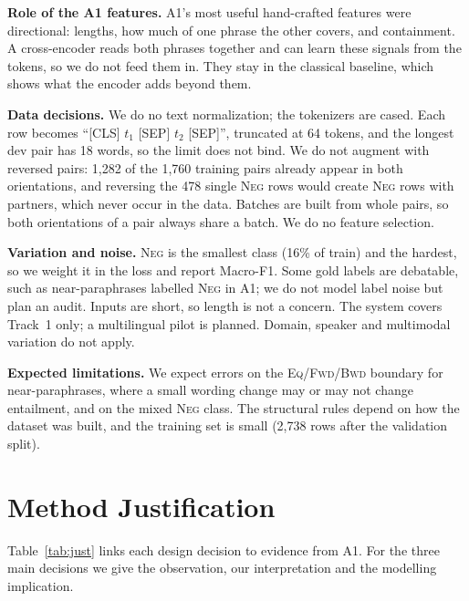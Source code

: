 \documentclass[10pt,a4paper,twocolumn]{article}
\newcommand{\Eq}{\textsc{Eq}}
\newcommand{\Fwd}{\textsc{Fwd}}
\newcommand{\Bwd}{\textsc{Bwd}}
\newcommand{\Neg}{\textsc{Neg}}
\begin{document}
\textbf{Role of the A1 features.} A1's most useful hand-crafted features were directional: lengths, how much of one phrase the other covers, and containment. A cross-encoder reads both phrases together and can learn these signals from the tokens, so we do not feed them in. They stay in the classical baseline, which shows what the encoder adds beyond them.

\textbf{Data decisions.} We do no text normalization; the tokenizers are cased. Each row becomes ``[CLS] $t_1$ [SEP] $t_2$ [SEP]'', truncated at 64 tokens, and the longest dev pair has 18 words, so the limit does not bind. We do not augment with reversed pairs: 1,282 of the 1,760 training pairs already appear in both orientations, and reversing the 478 single \Neg{} rows would create \Neg{} rows with partners, which never occur in the data. Batches are built from whole pairs, so both orientations of a pair always share a batch. We do no feature selection.

\textbf{Variation and noise.} \Neg{} is the smallest class (16\% of train) and the hardest, so we weight it in the loss and report Macro-F1. Some gold labels are debatable, such as near-paraphrases labelled \Neg{} in A1; we do not model label noise but plan an audit. Inputs are short, so length is not a concern. The system covers Track~1 only; a multilingual pilot is planned. Domain, speaker and multimodal variation do not apply.

\textbf{Expected limitations.} We expect errors on the \Eq/\Fwd/\Bwd{} boundary for near-paraphrases, where a small wording change may or may not change entailment, and on the mixed \Neg{} class. The structural rules depend on how the dataset was built, and the training set is small (2,738 rows after the validation split).

\section{Method Justification}
\label{sec:just}

Table~\ref{tab:just} links each design decision to evidence from A1. For the three main decisions we give the observation, our interpretation and the modelling implication.
\end{document}
